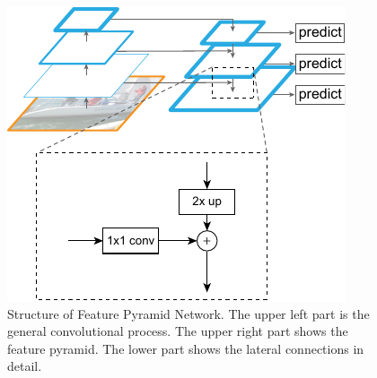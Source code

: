 \begin{figure}[!h]
	\centering
	\includegraphics[width=\figfi\textwidth]{3-12.pdf}
    \caption[Structure of Feature Pyramid Network]{Structure of Feature Pyramid Network. The upper left part is the general convolutional process. The upper right part shows the feature pyramid. The lower part shows the lateral connections in detail.}
    \label{fig:fpn}
\end{figure}